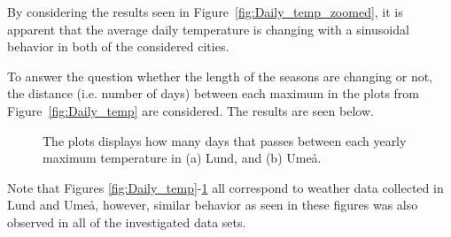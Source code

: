 By considering the results seen in Figure~\ref{fig:Daily_temp_zoomed}, it is apparent that the average daily temperature is changing with a sinusoidal behavior in both of the considered cities. 

To answer the question whether the length of the seasons are changing or not, the distance (i.e. number of days) between each maximum in the plots from Figure~\ref{fig:Daily_temp} are considered. The results are seen below.
\begin{figure}[H]
    \centering
    \quad
    \caption{The plots displays how many days that passes between each yearly maximum temperature in (a) Lund, and (b) Umeå.}
    \label{fig:season_length}
\end{figure}

Note that Figures \ref{fig:Daily_temp}-\ref{fig:season_length} all correspond to weather data collected in Lund and Umeå, however, similar behavior as seen in these figures was also observed in all of the investigated data sets.